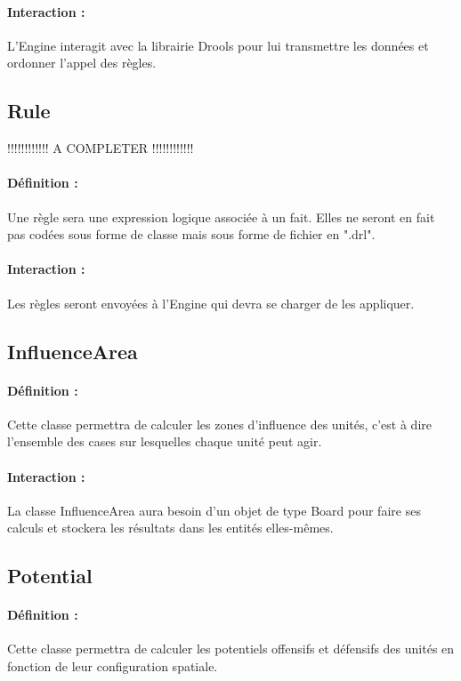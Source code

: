 			\paragraph{Interaction :}
			L'Engine interagit avec la librairie Drools pour lui transmettre les données et ordonner l'appel des règles.

		\subsection*{Rule}

			!!!!!!!!!!!! A COMPLETER !!!!!!!!!!!!
			\paragraph{Définition :}
			Une règle sera une expression logique associée à un fait. Elles ne seront en fait pas codées sous forme de classe mais 
			sous forme de fichier en ".drl".
			\paragraph{Interaction :}
			Les règles seront envoyées à l'Engine qui devra se charger de les appliquer.

		\subsection*{InfluenceArea}

			\paragraph{Définition :}
			Cette classe permettra de calculer les zones d'influence des unités, c'est à dire l'ensemble des cases sur lesquelles 
			chaque unité peut agir.
			\paragraph{Interaction :}
			La classe InfluenceArea aura besoin d'un objet de type Board pour faire ses calculs et stockera les résultats dans 
			les entités elles-mêmes.

		\subsection*{Potential}

			\paragraph{Définition :}
			Cette classe permettra de calculer les potentiels offensifs et défensifs des unités en fonction de leur configuration spatiale.
